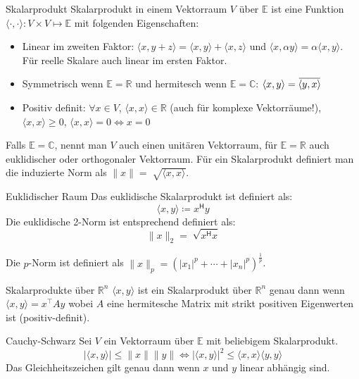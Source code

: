 \documentclass[a4paper,10pt]{article}
\newcommand*{\hermconj}{\mathsf{H}}
\def\R{\mathbb{R}}
\newcommand{\overbar}[1]{\mkern 1.5mu\overline{\mkern-1.5mu#1\mkern-1.5mu}\mkern 1.5mu}
\begin{document}
\begin{subbox}{Skalarprodukt}
  Skalarprodukt in einem Vektorraum $V$ über $\mathbb{E}$ ist eine Funktion $\langle \cdot, \cdot \rangle : V \times V \mapsto \mathbb{E}$ mit folgenden Eigenschaften:
  \begin{itemize}
    \item Linear im zweiten Faktor: $\langle x, y + z \rangle = \langle x, y \rangle + \langle x, z \rangle$ und $\langle x, \alpha y \rangle = \alpha \langle x, y \rangle$. Für reelle Skalare auch linear im ersten Faktor.
    \item  Symmetrisch wenn $\mathbb{E} = \mathbb{R}$ und hermitesch wenn $\mathbb{E} = \mathbb{C}$: $\langle x, y \rangle = \overbar{\langle y, x \rangle}$
    \item Positiv definit: $\forall x \in V$, $\langle x, x \rangle \in \mathbb{R}$ (auch für komplexe Vektorräume!), $\langle x, x \rangle \geq 0$, $\langle x, x \rangle = 0 \iff x = 0$
  \end{itemize}
  Falls $\mathbb{E} = \mathbb{C}$, nennt man $V$ auch einen unitären Vektorraum, für $\mathbb{E} = \mathbb{R}$ auch euklidischer oder orthogonaler Vektorraum. Für ein Skalarprodukt definiert man die induzierte Norm als $\lVert x \rVert = \sqrt[]{\langle x, x \rangle}$.
\end{subbox}

\begin{subbox}{Euklidischer Raum}
  Das euklidische Skalarprodukt ist definiert als: $$\langle x, y \rangle \coloneqq x^\hermconj y$$
  Die euklidische 2-Norm ist entsprechend definiert als: $$\lVert x \rVert_2 = \sqrt[]{x^\hermconj x}$$
\end{subbox}

Die $p$-Norm ist definiert als $\lVert x \rVert_p = (|x_1|^p + \cdots + |x_n|^p)^{\frac{1}{p}}$.

\begin{subbox}{Skalarprodukte über $\R^n$}
  $\langle x, y \rangle$ ist ein Skalarprodukt über $\R^n$ genau dann wenn $\langle x, y \rangle = x^\top A y$ wobei $A$ eine hermitesche Matrix mit strikt positiven Eigenwerten ist (positiv-definit).
\end{subbox}

\begin{mainbox}{Cauchy-Schwarz}
  Sei $V$ ein Vektorraum über $\mathbb{E}$ mit beliebigem Skalarprodukt.
  $$| \langle x, y \rangle | \leq \lVert x \rVert \lVert y \rVert \iff | \langle x, y \rangle |^2 \leq \langle x, x \rangle \langle y, y \rangle$$
  Das Gleichheitszeichen gilt genau dann wenn $x$ und $y$ linear abhängig sind.
\end{mainbox}
\end{document}
